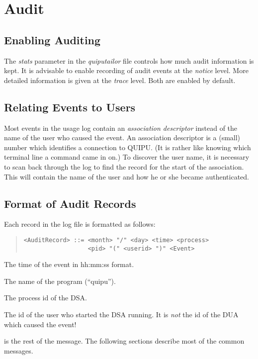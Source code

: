 \section{Audit}

\subsection{Enabling Auditing}

The {\em stats} parameter in the {\em quiputailor} file controls how much audit
information is kept. It is advisable to enable recording of audit events at 
the {\em notice} level.  More detailed information is given at the 
{\em trace} level.  Both are enabled by default.

\subsection{Relating Events to Users}

Most events in the usage log contain an {\em association descriptor} instead
of the name of the user who caused the event. An association descriptor is
a (small) number which identifies a connection to QUIPU. (It is rather like
knowing which terminal line a command came in on.) To discover the user name,
it is necessary to scan back through the log to find the record for the start
of the association. This will contain the name of the user and how he
or she became authenticated.

\subsection{Format of Audit Records}

Each record in the log file is formatted as follows:

\begin{quote}\begin{verbatim}
<AuditRecord> ::= <month> "/" <day> <time> <process> 
                  <pid> "(" <userid> ")" <Event>
\end{verbatim}\end{quote}

\begin{describe}
\item [\verb+time+:]
The time of the event in hh:mm:ss format.
\item [\verb+process+:]
The name of the program (``quipu'').
\item [\verb+pid+:]
The process id of the DSA.
\item [\verb+userid+:]
The id of the user who started the DSA running. It is {\em not} the id
of the DUA which caused the event!
\item [\verb+Event+:]
is the rest of the message. The following sections describe most of the
common messages.
\end{describe}
	

